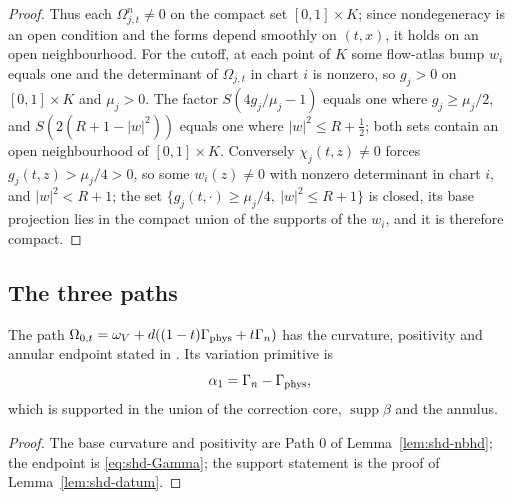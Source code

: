 \begin{proof}
Thus each $\Omega_{j,t}^n\ne0$ on the compact set $[0,1]\times K$; since nondegeneracy is an open condition and the forms
depend smoothly on $(t,x)$, it holds on an open neighbourhood. For the cutoff, at each point of $K$ some flow-atlas
bump $w_i$ equals one and the determinant of $\Omega_{j,t}$ in chart $i$ is nonzero, so $g_j>0$ on $[0,1]\times K$ and
$\mu_j>0$. The factor $S(4g_j/\mu_j-1)$ equals one where $g_j\ge\mu_j/2$, and $S(2(R+1-|w|^2))$ equals one where
$|w|^2\le R+\frac12$; both sets contain an open neighbourhood of $[0,1]\times K$. Conversely $\chi_j(t,z)\ne0$ forces
$g_j(t,z)>\mu_j/4>0$, so some $w_i(z)\ne0$ with nonzero determinant in chart $i$, and $|w|^2<R+1$; the set
$\{g_j(t,\cdot)\ge\mu_j/4,\ |w|^2\le R+1\}$ is closed, its base projection lies in the compact union of the supports of the $w_i$,
and it is therefore compact.
\end{proof}

\subsection{The three paths}\label{sec:shd-first}

\begin{proposition}\label{prop:shd-first-path}
The path $\Omega_{0,t}=\omega_V+d((1-t)\Gamma_{\rm phys}+t\Gamma_n)$ has the curvature, positivity and annular endpoint
stated in . Its variation primitive is
\begin{equation}\label{eq:shd-alpha1}\alpha_1=\Gamma_n-\Gamma_{\rm phys},\end{equation}
which is supported in the union of the correction core, $\operatorname{supp}\beta$ and the annulus.
\end{proposition}
\begin{proof}
The base curvature and positivity are Path $0$ of Lemma~\ref{lem:shd-nbhd}; the endpoint is \eqref{eq:shd-Gamma}; the support
statement is the proof of Lemma~\ref{lem:shd-datum}.
\end{proof}

